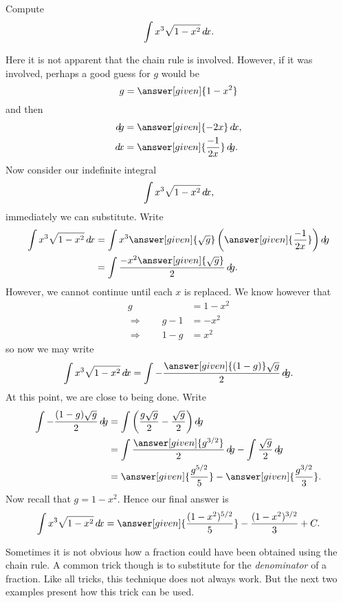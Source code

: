 \documentclass{ximera}
\begin{document}
\begin{example} Compute
\[
\int x^3\sqrt{1-x^2}\mathop{}\!d\! x.
\]
\begin{explanation}
Here it is not apparent that the chain rule is involved. However, if
it was involved, perhaps a good guess for $g$ would be
\[
g = \answer[given]{1-x^2}
\]
and then
\begin{align*}
  \d g &= \answer[given]{-2x} \d x, \\
  \d x &= \answer[given]{\frac{-1}{2x}} \d g.
\end{align*}
Now consider our indefinite integral
\[
\int x^3\sqrt{1-x^2}\mathop{}\!d\! x,
\]
immediately we can substitute. Write
\begin{align*}
  \int x^3\sqrt{1-x^2}\d x &= \int x^3 \answer[given]{\sqrt{g}} \left( \answer[given]{\frac{-1}{2x}} \right) \d g \\
  &= \int \frac{-x^2 \answer[given]{\sqrt{g}}}{2}\d g.
\end{align*}
However, we cannot continue until each $x$ is replaced. We know however that 
\begin{align*}
g &= 1-x^2 \\
\Rightarrow \qquad g -1 &= -x^2\\
\Rightarrow \qquad 1- g &= x^2
\end{align*}
so now we may write
\[
\int x^3\sqrt{1-x^2}\d x = \int -\frac{\answer[given]{(1-g)} \sqrt{g}}{2}\d g.
\]
At this point, we are close to being done. Write
\begin{align*}
\int -\frac{(1-g)\sqrt{g}}{2}\d g &= \int \left(\frac{g\sqrt{g}}{2} - \frac{\sqrt{g}}{2}\right) \d g \\
&= \int \frac{\answer[given]{g^{3/2}}}{2} \d g - \int \frac{\sqrt{g}}{2} \d g \\
&= \answer[given]{\frac{g^{5/2}}{5}} - \answer[given]{\frac{g^{3/2}}{3}}.
\end{align*}
Now recall that $g = 1-x^2$. Hence our final answer is
\[
\int x^3\sqrt{1-x^2}\d x = \answer[given]{\frac{(1-x^2)^{5/2}}{5}} - \frac{(1-x^2)^{3/2}}{3}+C.
\]
\end{explanation}
\end{example}


Sometimes it is not obvious how a fraction could have been obtained using the chain rule.  
A common trick though is to substitute for the \textit{denominator} of a fraction.  
Like all tricks, this technique does not always work.  
But the next two examples present how this trick can be used.
\end{document}
